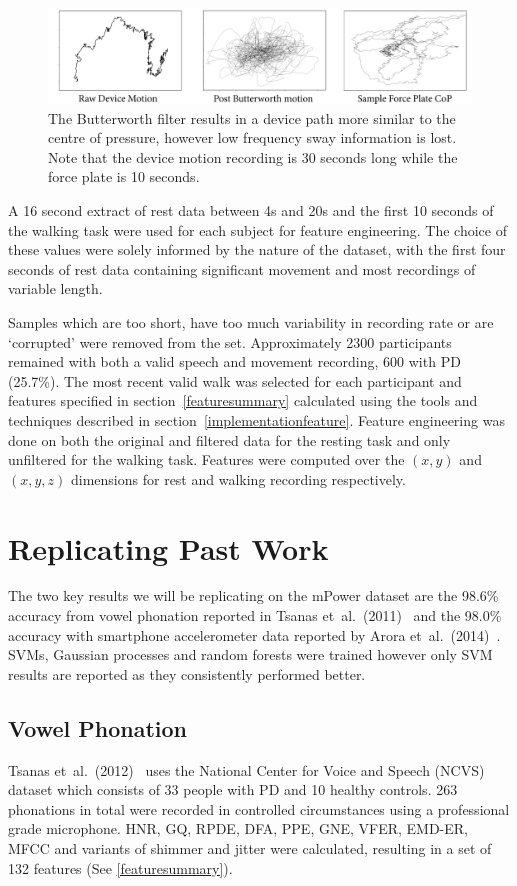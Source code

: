 \documentclass[12pt, twoside]{book}
\begin{document}
\begin{figure}[h]
	\label{butterworth}
	\centering\centerline{\includegraphics[width=1.2\linewidth]{butterworth.png}}
	\caption{The Butterworth filter results in a device path more similar to the centre of pressure, however low frequency sway information is lost. Note that the device motion recording is 30 seconds long while the force plate is 10 seconds.}
\end{figure}

A 16 second extract of rest data between 4s and 20s and the first 10 seconds of the walking task were used for each subject for feature engineering. The choice of these values were solely informed by the nature of the dataset, with the first four seconds of rest data containing significant movement and most recordings of variable length.

Samples which are too short, have too much variability in recording rate or are `corrupted' were removed from the set. Approximately 2300 participants remained with both a valid speech and movement recording, 600 with PD (25.7\%). The most recent valid walk was selected for each participant and features specified in section~\ref{featuresummary} calculated using the tools and techniques described in section~\ref{implementationfeature}.  Feature engineering was done on both the original and filtered data for the resting task and only unfiltered for the walking task. Features were computed over the $(x,y)$ and $(x,y,z)$ dimensions for rest and walking recording respectively.


\section{Replicating Past Work}
The two key results we will be replicating on the mPower dataset are the 98.6\% accuracy from vowel phonation reported in Tsanas et~al.~(2011)~\cite{tsanas2012novel} and the 98.0\% accuracy with smartphone accelerometer data reported by Arora et~al.~(2014)~\cite{arora2014high}. SVMs, Gaussian processes and random forests were trained however only SVM results are reported as they consistently performed better.

\subsection{Vowel Phonation}
\label{phonationpast}
Tsanas et~al.~(2012)~\cite{tsanas2012novel} uses the National Center for Voice and Speech (NCVS) dataset which consists of 33 people with PD and 10 healthy controls. 263 phonations in total were recorded in controlled circumstances using a professional grade microphone. HNR, GQ, RPDE, DFA, PPE, GNE, VFER, EMD-ER, MFCC and variants of shimmer and jitter were calculated, resulting in a set of 132 features (See \ref{featuresummary}).
\end{document}
